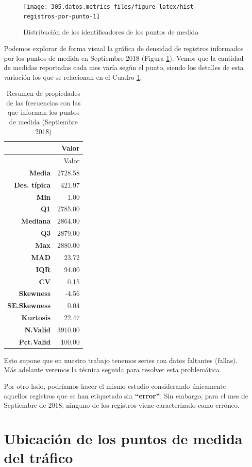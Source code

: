 \documentclass[]{book}
\begin{document}
\begin{figure}[H]

{\centering \texttt{[image: 305.datos.metrics\_files/figure-latex/hist-registros-por-punto-1]} 

}

\caption{Distribución de los identificadores de los puntos de medida}\label{fig:hist-registros-por-punto}
\end{figure}

Podemos explorar de forma visual la gráfica de densidad de registros
informados por los puntos de medida en Septiembre 2018 (Figura
\ref{fig:hist-registros-por-punto}). Vemos que la cantidad de medidas
reportadas cada mes varía según el punto, siendo los detalles de esta
variación los que se relacionan en el Cuadro \ref{tabs:descr-freqs}.

\begin{longtable}[]{@{}rr@{}}
\caption{\label{tabs:descr-freqs}Resumen de propiedades de las
frecuencias con las que informan los puntos de medida (Septiembre
2018)}\tabularnewline
\toprule
~ & Valor\tabularnewline
\midrule
\endfirsthead
\toprule
~ & Valor\tabularnewline
\midrule
\endhead
\textbf{Media} & 2728.58\tabularnewline
\textbf{Des. típica} & 421.97\tabularnewline
\textbf{Min} & 1.00\tabularnewline
\textbf{Q1} & 2785.00\tabularnewline
\textbf{Mediana} & 2864.00\tabularnewline
\textbf{Q3} & 2879.00\tabularnewline
\textbf{Max} & 2880.00\tabularnewline
\textbf{MAD} & 23.72\tabularnewline
\textbf{IQR} & 94.00\tabularnewline
\textbf{CV} & 0.15\tabularnewline
\textbf{Skewness} & -4.56\tabularnewline
\textbf{SE.Skewness} & 0.04\tabularnewline
\textbf{Kurtosis} & 22.47\tabularnewline
\textbf{N.Valid} & 3910.00\tabularnewline
\textbf{Pct.Valid} & 100.00\tabularnewline
\bottomrule
\end{longtable}

Esto supone que en nuestro trabajo tenemos series con datos faltantes
(fallas). Más adelante veremos la técnica seguida para resolver esta
problemática.

Por otro lado, podríamos hacer el mismo estudio considerando únicamente
aquellos registros que se han etiquetado sin \textbf{``error''}. Sin
embargo, para el mes de Septiembre de 2018, ninguno de los registros
viene caracterizado como erróneo.

\section{Ubicación de los puntos de medida del
tráfico}\label{ubicacion-de-los-puntos-de-medida-del-trafico}
\end{document}
